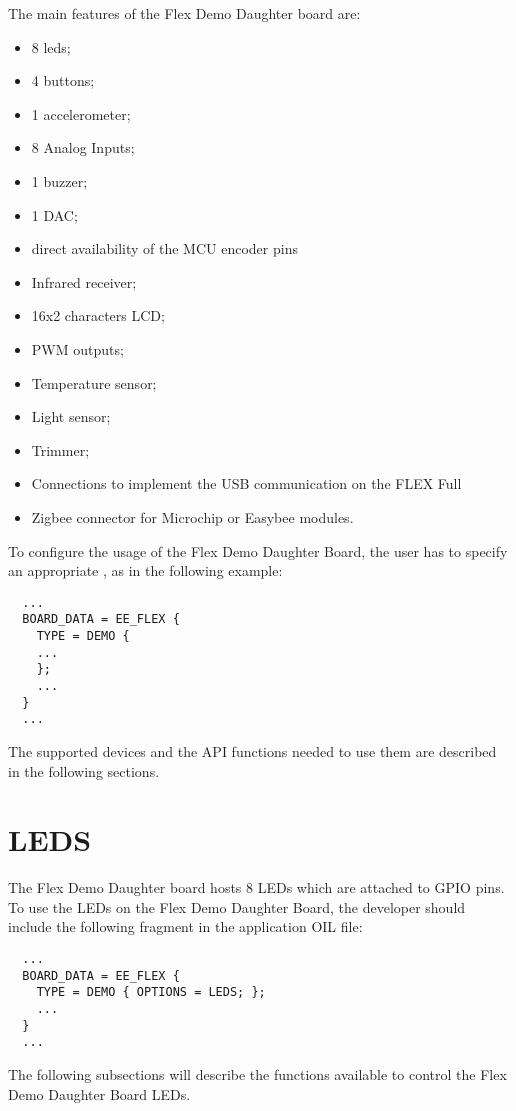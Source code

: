 The main features of the Flex Demo Daughter board are:
\begin{itemize}
\item 8 leds;
\item 4 buttons;
\item 1 accelerometer;
\item 8 Analog Inputs;
\item 1 buzzer;
\item 1 DAC;
\item direct availability of the MCU encoder pins
\item Infrared receiver;
\item 16x2 characters LCD;
\item PWM outputs;
\item Temperature sensor;
\item Light sensor;
\item Trimmer;
\item Connections to implement the USB communication on the FLEX Full
\item Zigbee connector for Microchip or Easybee modules.
\end{itemize}

%
%

To configure the usage of the Flex Demo Daughter Board, the user has
to specify an appropriate , as in the following
example:

\begin{lstlisting}
  ...
  BOARD_DATA = EE_FLEX {
    TYPE = DEMO {
	...
    };
    ...
  }
  ...
\end{lstlisting}

The supported devices and the API functions needed to use them are
described in the following sections.

\section{LEDS}

The Flex Demo Daughter board hosts 8 LEDs which are attached to GPIO
pins. To use the LEDs on the Flex Demo Daughter Board, the developer should
include the following fragment in the application OIL file:
\begin{lstlisting}
  ...
  BOARD_DATA = EE_FLEX {
    TYPE = DEMO { OPTIONS = LEDS; };
    ...
  }
  ...
\end{lstlisting}

The following subsections will describe the functions available to
control the Flex Demo Daughter Board LEDs.

